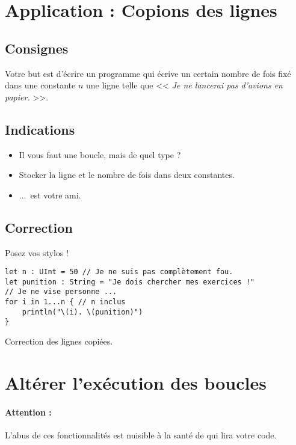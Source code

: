 \section{Application : Copions des lignes}
\subsection{Consignes}
Votre but est d'écrire un programme qui
écrive un certain nombre de fois fixé dans une constante $n$ une ligne telle que << \emph{Je ne lancerai pas d'avions en papier.} >>.
\pagebreak %
\subsection{Indications}
\begin{itemize}
\item Il vous faut une boucle, mais de quel type ?

\item Stocker la ligne et le nombre de fois dans deux constantes.

\item ...\ est votre ami.
\end{itemize}
\pagebreak %
\subsection{Correction}
Posez vos stylos !
\begin{listing}[h]
\begin{verbatim}
let n : UInt = 50 // Je ne suis pas complètement fou.
let punition : String = "Je dois chercher mes exercices !"
// Je ne vise personne ...
for i in 1...n { // n inclus
    println("\(i). \(punition)")
}
\end{verbatim}
\caption{Correction des lignes copiées.}
\end{listing}%
\section{Altérer l'exécution des boucles}
\paragraph{Attention :}
L'abus de ces fonctionnalités est nuisible à la santé de qui lira votre code.
